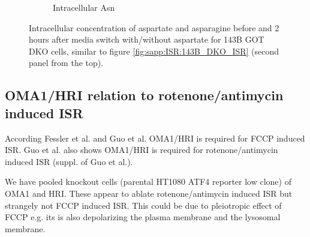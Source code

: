 \begin{figure}[!ht]
\begin{subfigure}[b]{0.35\textwidth}
         \caption{Intracellular Asn}
         \label{fig:sapp:ISR:143B_GOT_DKO_ISR_Asn_conc}
     \end{subfigure}
     \hfill
        \caption[Intracellular Asp/Asn at ISR in GOT DKO]{
        Intracellular concentration of aspartate and asparagine before and 2 hours after media switch with/without aspartate for 143B GOT DKO cells, similar to figure \ref{fig:sapp:ISR:143B_DKO_ISR} (second panel from the top).
        }
        \label{fig:sapp:ISR:143B_GOT_DKO_ISR_conc}
\end{figure}





\FloatBarrier
\subsection{OMA1/HRI relation to rotenone/antimycin induced ISR}
According Fessler et al. and Guo et al. \cite{Fessler2020-zk, Guo2020-ia} OMA1/HRI is required for FCCP induced ISR.
Guo et al. also shows OMA1/HRI is required for rotenone/antimycin induced ISR (suppl. of Guo et al.).

We have pooled knockout cells (parental HT1080 ATF4 reporter low clone) of OMA1 and HRI.
These appear to ablate rotenone/antimycin induced ISR but strangely not FCCP induced ISR.
This could be due to pleiotropic effect of FCCP e.g. its is also depolarizing the plasma membrane and the lysosomal membrane.

